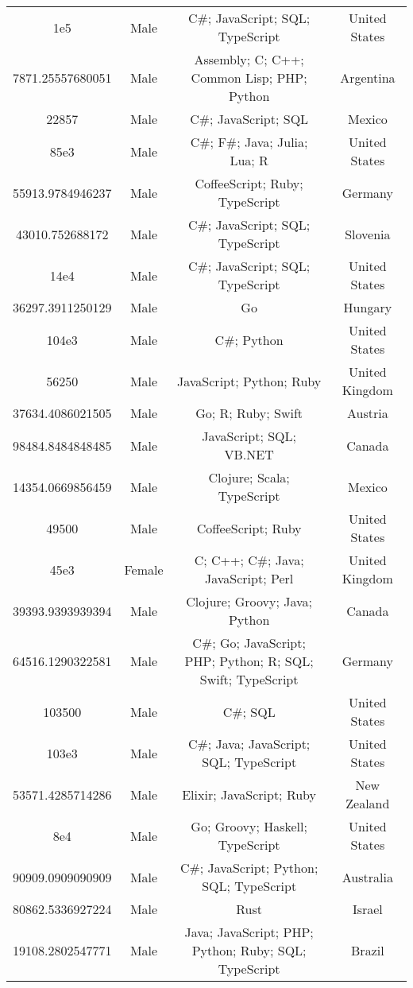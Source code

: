 \begin{center}
\begin{tabular}{ |c|c|c|c| }
1e5  &  Male  &  C\#; JavaScript; SQL; TypeScript  &  United States  \\ 
7871.25557680051  &  Male  &  Assembly; C; C++; Common Lisp; PHP; Python  &  Argentina  \\ 
22857  &  Male  &  C\#; JavaScript; SQL  &  Mexico  \\ 
85e3  &  Male  &  C\#; F\#; Java; Julia; Lua; R  &  United States  \\ 
55913.9784946237  &  Male  &  CoffeeScript; Ruby; TypeScript  &  Germany  \\ 
43010.752688172  &  Male  &  C\#; JavaScript; SQL; TypeScript  &  Slovenia  \\ 
14e4  &  Male  &  C\#; JavaScript; SQL; TypeScript  &  United States  \\ 
36297.3911250129  &  Male  &  Go  &  Hungary  \\ 
104e3  &  Male  &  C\#; Python  &  United States  \\ 
56250  &  Male  &  JavaScript; Python; Ruby  &  United Kingdom  \\ 
37634.4086021505  &  Male  &  Go; R; Ruby; Swift  &  Austria  \\ 
98484.8484848485  &  Male  &  JavaScript; SQL; VB.NET  &  Canada  \\ 
14354.0669856459  &  Male  &  Clojure; Scala; TypeScript  &  Mexico  \\ 
49500  &  Male  &  CoffeeScript; Ruby  &  United States  \\ 
45e3  &  Female  &  C; C++; C\#; Java; JavaScript; Perl  &  United Kingdom  \\ 
39393.9393939394  &  Male  &  Clojure; Groovy; Java; Python  &  Canada  \\ 
64516.1290322581  &  Male  &  C\#; Go; JavaScript; PHP; Python; R; SQL; Swift; TypeScript  &  Germany  \\ 
103500  &  Male  &  C\#; SQL  &  United States  \\ 
103e3  &  Male  &  C\#; Java; JavaScript; SQL; TypeScript  &  United States  \\ 
53571.4285714286  &  Male  &  Elixir; JavaScript; Ruby  &  New Zealand  \\ 
8e4  &  Male  &  Go; Groovy; Haskell; TypeScript  &  United States  \\ 
90909.0909090909  &  Male  &  C\#; JavaScript; Python; SQL; TypeScript  &  Australia  \\ 
80862.5336927224  &  Male  &  Rust  &  Israel  \\ 
19108.2802547771  &  Male  &  Java; JavaScript; PHP; Python; Ruby; SQL; TypeScript  &  Brazil  \\ 

\end{tabular}
\end{center}
